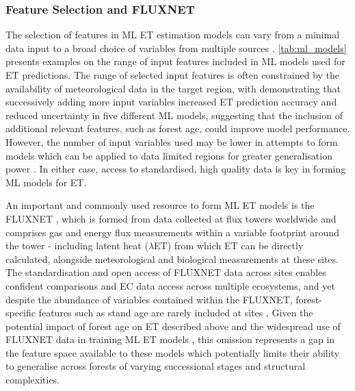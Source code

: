 \documentclass[paper=a4,fontsize=12pt]{scrartcl}
\begin{document}
\subsubsection{Feature Selection and FLUXNET}
The selection of features in ML ET estimation models can vary from a minimal data input \parencite{ahmadi2024solaret} to a broad choice of variables from multiple sources \parencite{liu2021assessment}. \autoref{tab:ml_models} presents examples on the range of input features included in ML models used for ET predictions. The range of selected input features is often constrained by the availability of meteorological data in the target region, with \textcite{xu2018evaluating} demonstrating that successively adding more input variables increased ET prediction accuracy and reduced uncertainty in five different ML models, suggesting that the inclusion of additional relevant features, such as forest age, could improve model performance. However, the number of input variables used may be lower in attempts to form models which can be applied to data limited regions for greater generalisation power \parencite{ahmadi2024solaret}. In either case, access to standardised, high quality data is key in forming ML models for ET.
\par An important and commonly used resource to form ML ET models is the FLUXNET \parencite{baldocchi2001fluxnet, pastorello2020fluxnet2015}, which is formed from data collected at flux towers worldwide and comprises gas and energy flux measurements within a variable footprint around the tower - including latent heat ($\lambda$ET) from which ET can be directly calculated, alongside meteorological and biological measurements at these sites. The standardisation and open access of FLUXNET data across sites enables confident comparisons and EC data access across multiple ecosystems, and yet despite the abundance of variables contained within the FLUXNET, forest-specific features such as stand age are rarely included at sites  \parencite{pastorello2020fluxnet2015}. Given the potential impact of forest age on ET described above and the widespread use of FLUXNET data in training ML ET models \parencite{jung2010recent,besnard2018quantifying,wang2022recent}, this omission represents a gap in the feature space available to these models which potentially limits their ability to generalise across forests of varying successional stages and structural complexities.
\end{document}
